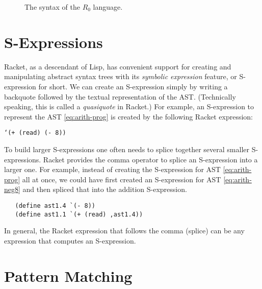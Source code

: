 \documentclass[11pt]{book}
\begin{document}
\begin{figure}[tbp]
\caption{The syntax of the $R_0$ language.}
\label{fig:r0-syntax}
\end{figure}

\section{S-Expressions}
\label{sec:s-expr}

Racket, as a descendant of Lisp, has
convenient support for creating and manipulating abstract syntax trees
with its \emph{symbolic expression} feature, or S-expression for
short. We can create an S-expression simply by writing a backquote
followed by the textual representation of the AST. (Technically
speaking, this is called a \emph{quasiquote} in Racket.)  For example,
an S-expression to represent the AST \eqref{eq:arith-prog} is created
by the following Racket expression:
\begin{center}
\texttt{`(+ (read) (- 8))}
\end{center}

To build larger S-expressions one often needs to splice together
several smaller S-expressions. Racket provides the comma operator to
splice an S-expression into a larger one. For example, instead of
creating the S-expression for AST \eqref{eq:arith-prog} all at once,
we could have first created an S-expression for AST
\eqref{eq:arith-neg8} and then spliced that into the addition
S-expression.
\begin{lstlisting}
   (define ast1.4 `(- 8))
   (define ast1.1 `(+ (read) ,ast1.4))
\end{lstlisting}
In general, the Racket expression that follows the comma (splice)
can be any expression that computes an S-expression.

\section{Pattern Matching}
\label{sec:pattern-matching}
\end{document}
